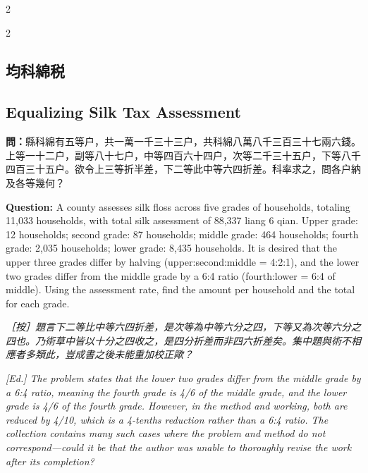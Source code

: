 \documentclass[11pt,a4paper]{article}
\newcommand{\QuestionText}[1]{\par\noindent\textbf{\color{problemcolor}問：}#1\par}
\newcommand{\EdNoteText}[1]{\par\noindent\textit{\color{ednotecolor}［按］#1}\par}
\newcommand{\QuestionEn}[1]{\par\noindent\textbf{\color{problemcolor}Question:} #1\par}
\newcommand{\EdNoteEn}[1]{\par\noindent\textit{\color{ednotecolor}[Ed.] #1}\par}
\begin{document}
\begin{paracol}{2}
\end{paracol}

\begin{paracol}{2}

\subsection*{\color{sectioncolor}均科綿税}
\switchcolumn
\subsection*{\color{sectioncolor}Equalizing Silk Tax Assessment}
\switchcolumn*

\QuestionText{縣科綿有五等户，共一萬一千三十三户，共科綿八萬八千三百三十七兩六錢。上等一十二户，副等八十七户，中等四百六十四户，次等二千三十五户，下等八千四百三十五户。欲令上三等折半差，下二等此中等六四折差。科率求之，問各户納及各等幾何？}
\switchcolumn
\QuestionEn{A county assesses silk floss across five grades of households, totaling 11,033 households, with total silk assessment of 88,337 liang 6 qian. Upper grade: 12 households; second grade: 87 households; middle grade: 464 households; fourth grade: 2,035 households; lower grade: 8,435 households. It is desired that the upper three grades differ by halving (upper:second:middle = 4:2:1), and the lower two grades differ from the middle grade by a 6:4 ratio (fourth:lower = 6:4 of middle). Using the assessment rate, find the amount per household and the total for each grade.}
\switchcolumn*

\EdNoteText{題言下二等比中等六四折差，是次等為中等六分之四，下等又為次等六分之四也。乃術草中皆以十分之四收之，是四分折差而非四六折差矣。集中題與術不相應者多類此，豈成書之後未能重加校正歟？}
\switchcolumn
\EdNoteEn{The problem states that the lower two grades differ from the middle grade by a 6:4 ratio, meaning the fourth grade is 4/6 of the middle grade, and the lower grade is 4/6 of the fourth grade. However, in the method and working, both are reduced by 4/10, which is a 4-tenths reduction rather than a 6:4 ratio. The collection contains many such cases where the problem and method do not correspond---could it be that the author was unable to thoroughly revise the work after its completion?}
\switchcolumn*


\end{paracol}
\end{document}
